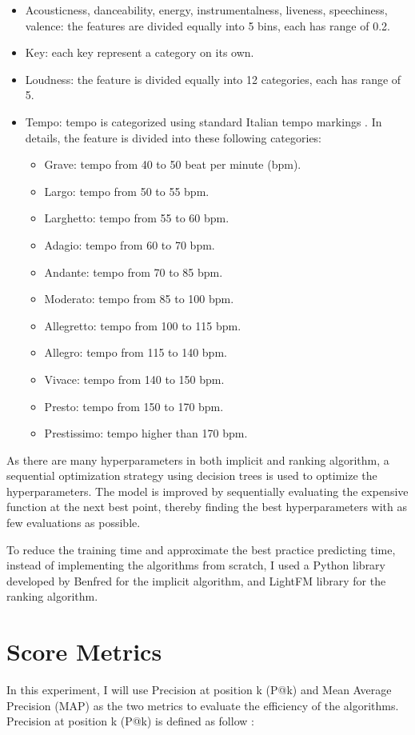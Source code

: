 \begin{itemize}
	\item Acousticness, danceability, energy, instrumentalness, liveness, speechiness, valence: the features are divided equally into 5 bins, each has range of 0.2.
	\item Key: each key represent a category on its own.
	\item Loudness: the feature is divided equally into 12 categories, each has range of 5.
	\item Tempo: tempo is categorized using standard Italian tempo markings \cite{2018Tempo}. In details, the feature is divided into these following categories:
	\begin{itemize}
		\item Grave: tempo from 40 to 50 beat per minute (bpm).
		\item Largo: tempo from 50 to 55 bpm.
		\item Larghetto: tempo from 55 to 60 bpm.
		\item Adagio: tempo from 60 to 70 bpm.
		\item Andante: tempo from 70 to 85 bpm.
		\item Moderato: tempo from 85 to 100 bpm.
		\item Allegretto: tempo from 100 to 115 bpm.
		\item Allegro: tempo from 115 to 140 bpm.
		\item Vivace: tempo from 140 to 150 bpm.
		\item Presto: tempo from 150 to 170 bpm.
		\item Prestissimo: tempo higher than 170 bpm.
\end{itemize}	  
\end{itemize}

As there are many hyperparameters in both implicit and ranking algorithm, a sequential optimization strategy using decision trees is used to optimize the hyperparameters. The model is improved by sequentially evaluating the expensive function at the next best point, thereby finding the best hyperparameters with as few evaluations as possible. 

To reduce the training time and approximate the best practice predicting time, instead of implementing the algorithms from scratch, I used a Python library developed by Benfred \cite{Benfred2018} for the implicit algorithm, and LightFM library \cite{DBLP:conf/recsys/Kula15} for the ranking algorithm.

\section{Score Metrics}
In this experiment, I will use Precision at position k (P@k) and Mean Average Precision (MAP) as the two metrics to evaluate the efficiency of the algorithms. Precision at position k (P@k) is defined as follow \cite{liu2009learning}:


